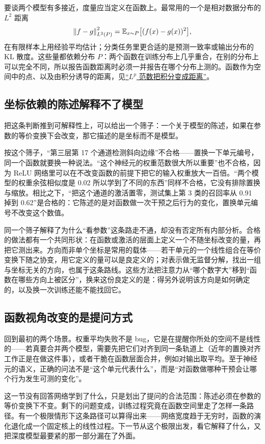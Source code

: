 要谈两个模型有多接近，度量应当定义在函数上。最常用的一个是相对数据分布的 \(L^2\) 距离
\[
\left\lVert f-g\right\rVert_{L^2(P)}^2=\mathbb{E}_{x\sim P}\bigl[(f(x)-g(x))^2\bigr],
\]
在有限样本上用经验平均估计；分类任务里更合适的是预测一致率或输出分布的 KL 散度。这些量都依赖分布 \(P\)：两个函数在训练分布上几乎重合，在别的分布上可以完全不同，所以报告函数距离时必须一并报告在哪个分布上测的。函数作为空间中的点、以及由积分诱导的距离，见\hyperref[sec:12-Real-Analysis-Support/07-Lp-Spaces-and-Function-Geometry/01]{``\(L^p\) 范数把积分变成距离''}。

\subsection{坐标依赖的陈述解释不了模型}

把这条判断推到可解释性上，可以给出一个筛子：一个关于模型的陈述，如果在参数的等价变换下会改变，那它描述的是坐标而不是模型。

按这个筛子，``第三层第 17 个通道检测斜向边缘''不合格——置换一下单元编号，同一个函数就要换一种说法。``这个神经元的权重范数很大所以重要''也不合格，因为 ReLU 网络里可以在不改变函数的前提下把它的输入权重放大一百倍。``两个模型的权重余弦相似度是 0.02 所以学到了不同的东西''同样不合格，它没有排除置换与缩放。相比之下，``把这个通道的激活置零，测试集上第 3 类的召回率从 0.91 掉到 0.62''是合格的：它陈述的是对函数做一次干预之后行为的变化，置换单元编号不改变这个数值。

同一个筛子解释了为什么``看参数''这条路走不通，却没有否定所有内部分析。合格的做法都有一个共同形状：在函数或激活的层面上定义一个不随坐标改变的量，再把它测出来。方向而非单个坐标是常用的载体——若干单元的一个线性组合在等价变换下随之协变，用它定义的量可以是良定义的；对表示做无监督分解，找出一组与坐标无关的方向，也属于这条路线。这些方法把注意力从``哪个数字大''移到``函数在哪些方向上被区分''，换来这份良定义的是：得另外说明该方向是如何确定的，以及换一次训练还能不能找回它。

\subsection{函数视角改变的是提问方式}

回到最初的两个场景。权重平均失败不是 bug，它是在提醒你所处的空间不是线性的——若真要合并两个模型，需要先把它们对齐到同一条轨道上（近年的置换对齐工作正是在做这件事），或者干脆在函数层面合并，例如对输出取平均。至于神经元的语义，正确的问法不是``这个单元代表什么''，而是``对函数做哪种干预会让哪个行为发生可测的变化''。

这一节没有回答网络学到了什么，只是划出了提问的合法范围：陈述必须在参数的等价变换下不变。剩下的问题变成，训练过程究竟在函数空间里走了怎样一条路径。有一个极限情形下这条路径可以算得出来——网络宽度趋于无穷时，函数的演化退化成一个固定核上的线性过程。下一节从这个极限出发，看它解释了什么，又把深度模型最要紧的那一部分漏在了外面。
